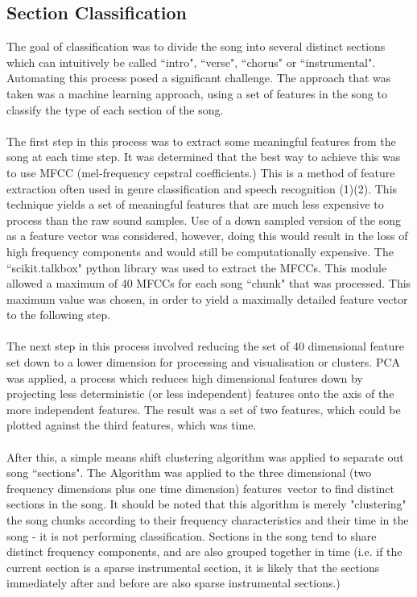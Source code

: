 \subsection{Section Classification}
The goal of classification was to divide the song into several distinct sections which can intuitively be called ``intro", ``verse", ``chorus" or ``instrumental". Automating this process posed a significant challenge. The approach that was taken was a machine learning approach, using a set of features in the song to classify the type of each section of the song. \\
\\
The first step in this process was to extract some meaningful features from the song at each time step. It was determined that the best way to achieve this was to use MFCC (mel-frequency cepstral coefficients.) This is a method of feature extraction often used in genre classification and speech recognition (1)(2). This technique yields a set of meaningful features that are much less expensive to process than the raw sound samples. Use of a down sampled version of the song as a feature vector was considered, however, doing this would result in the loss of high frequency components and would still be computationally expensive. The ``scikit.talkbox" python library was used to extract the MFCCs. This module allowed a maximum of 40 MFCCs for each song ``chunk" that was processed. This maximum value was chosen, in order to yield a maximally detailed feature vector to the following step.\\
\\
The next step in this process involved reducing the set of 40 dimensional feature set down to a lower dimension for processing and visualisation or clusters. PCA was applied, a process which reduces high dimensional features down by projecting less deterministic (or less independent) features onto the axis of the more independent features. The result was a set of two features, which could be plotted against the third features, which was time. \\
\\
After this, a simple means shift clustering algorithm was applied to separate out song ``sections". The Algorithm was applied to the three dimensional (two frequency dimensions plus one time dimension) features\ vector to find distinct sections in the song. It should be noted that this algorithm is merely "clustering" the song chunks according to their frequency characteristics and their time in the song - it is not performing classification. Sections in the song tend to share distinct frequency components, and are also grouped together in time (i.e. if the current section is a sparse instrumental section, it is likely that the sections immediately after and before are also sparse instrumental sections.)\\
